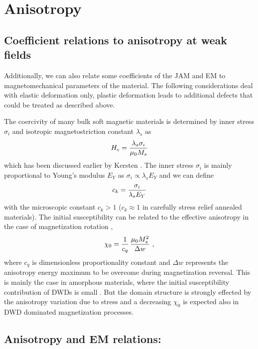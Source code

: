 \documentclass[../main.tex]{subfiles}
\begin{document}
\section{Anisotropy}

\subsection{Coefficient relations to anisotropy at weak fields}

Additionally, we can also relate some coefficients of the JAM and EM to
magnetomechanical parameters of the material. The following
considerations deal with elastic deformation only, plastic deformation
leads to additional defects that could be treated as described above.

The coercivity of many bulk soft magnetic materials is determined by inner
stress $\sigma_i$ and isotropic magnetostriction constant $\lambda_s$ as
\begin{equation}
  H_c = {\lambda_s \sigma_i \over \mu_0 M_s}
    \label{Hc}
\end{equation}
which has been discussed earlier by Kersten \cite{Kersten}. The inner stress
$\sigma_i$ is mainly proportional to Young's modulus $E_Y$ as
$\sigma_i\propto\lambda_sE_Y$ and we can define
\begin{equation}
  c_{k} = {\sigma_i\over \lambda_s E_Y}
  \label{cks}
\end{equation}
with the microscopic constant $c_{k}>1$ ($c_{k}\approx 1$ in carefully
stress relief annealed materials).
The initial susceptibility can be related to the effective anisotropy
in the case of magnetization rotation \cite{Kondorsky},
\begin{equation}
  \chi_0 = {1\over c_q}\,{\mu_0 M_s^2\over \Delta w} \ ,
  \label{cq}
\end{equation}
where $c_q$ is dimensionless proportionality constant and $\Delta w$ represents
the anisotropy energy maximum to be overcome during
magnetization reversal. This is mainly the case in amorphous materials, where
the initial susceptibility contribution of DWDs is small \cite{Appino}.
But the domain structure is strongly effected by the anisotropy variation due to
stress and a decreasing $\chi_0$ is expected also in DWD dominated magnetization
processes.


\subsection{Anisotropy and EM relations:}
\end{document}
